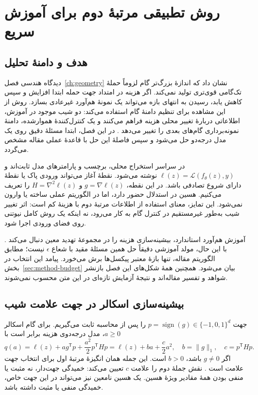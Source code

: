 \chapter{روش تطبیقی مرتبهٔ دوم برای آموزش سریع}
\label{ch:method}

\section{هدف و دامنهٔ تحلیل}
\label{sec:method-overview}

دیدگاه هندسی فصل~\ref{ch:geometry} نشان داد که اندازهٔ بزرگ‌تر گام لزوماً حملهٔ تک‌گامی قوی‌تری تولید نمی‌کند. اگر هزینه در امتداد جهت حمله ابتدا افزایش و سپس کاهش یابد، رسیدن به انتهای بازه می‌تواند یک نمونهٔ هم‌آورد غیرعادی بسازد. روش \sora{} از این مشاهده برای تنظیم دامنهٔ گام استفاده می‌کند: دو شیب موجود در آموزش، اطلاعاتی دربارهٔ تغییر محلی هزینه فراهم می‌کنند و یک کنترل‌کنندهٔ هموارشده، دامنهٔ نمونه‌برداری گام‌های بعدی را تغییر می‌دهد \cite{sora2026}. در این فصل، ابتدا مسئلهٔ دقیق روی یک مدل درجه‌دو حل می‌شود و سپس فاصلهٔ این حل با قاعدهٔ عملی مقاله مشخص می‌گردد.

در سراسر استخراج محلی، برچسب و پارامترهای مدل ثابت‌اند و $\ell(z)=\mathcal{L}(f_\theta(z),y)$ نوشته می‌شود. نقطهٔ آغاز می‌تواند ورودی پاک یا نقطهٔ دارای شروع تصادفی باشد. در این نقطه، $g=\nabla\ell(z)$ و $H=\nabla^2\ell(z)$ را تعریف می‌کنیم. هسین در استدلال حضور دارد، اما در الگوریتم عملی ساخته یا وارون نمی‌شود. این تمایز، معنای استفاده از اطلاعات مرتبهٔ دوم با هزینهٔ کم است: اثر تغییر شیب به‌طور غیرمستقیم در کنترل گام به کار می‌رود، نه اینکه یک روش کامل نیوتنی روی فضای ورودی اجرا شود.

آموزش هم‌آورد استاندارد، بیشینه‌سازی هزینه را در مجموعهٔ تهدید معین دنبال می‌کند \cite{madry2018towards}. با این حال، مولد آموزشی \sora{} دقیقاً حل همین مسئلهٔ مقید با شعاع $\epsilon$ نیست؛ مطابق الگوریتم مقاله، تنها بازهٔ معتبر پیکسل‌ها برش می‌خورد. پیامد این انتخاب در بخش~\ref{sec:method-budget} بیان می‌شود. همچنین همهٔ شکل‌های این فصل بازنشر شواهد و تفسیر مقاله‌اند و نتیجهٔ آزمایش تازه‌ای در این متن محسوب نمی‌شوند.

\section{بیشینه‌سازی اسکالر در جهت علامت شیب}
\label{sec:method-quadratic}

جهت $p=\operatorname{sign}(g)\in\{-1,0,1\}^d$ را پس از محاسبه ثابت می‌گیریم. برای گام اسکالر $a\geq0$، مدل درجه‌دوی هزینه برابر است با
\begin{equation}
q(a)=\ell(z)+a g^{\mathsf T}p+\frac{a^2}{2}p^{\mathsf T}Hp
=\ell(z)+ba+\frac{c}{2}a^2,
\quad b=\|g\|_1,\quad c=p^{\mathsf T}Hp.
\label{eq:method-quadratic}
\end{equation}
اگر $g\ne0$ باشد، $b>0$ است. این جمله همان انگیزهٔ مرتبهٔ اول برای انتخاب جهت علامت است \cite{goodfellow2015explaining}. نقش جملهٔ دوم را علامت $c$ تعیین می‌کند: خمیدگی جهت‌دار، نه مثبت یا منفی بودن همهٔ مقادیر ویژهٔ هسین. یک هسین نامعین نیز می‌تواند در این جهت خاص، خمیدگی منفی یا مثبت داشته باشد.

